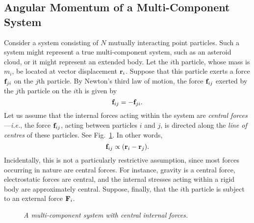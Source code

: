 \subsection{Angular Momentum of a Multi-Component System}\label{sam}
Consider a system consisting of $N$ mutually interacting point particles.
Such a system might represent a true multi-component system, such as an asteroid cloud,
or it might represent an extended body.
Let the $i$th particle, whose mass is $m_i$, be located at vector displacement ${\bf r}_i$.
Suppose that this particle exerts a force ${\bf f}_{ji}$ on the $j$th particle. By Newton's third
law of motion, the force ${\bf f}_{ij}$ exerted  by the $j$th particle on the $i$th  is
given by
\begin{equation}\label{e966}
{\bf f}_{ij} = - {\bf f}_{ji}.
\end{equation}
Let us assume that the internal forces acting within the system are {\em central forces}---{\em i.e.},
the force ${\bf f}_{ij}$, acting between particles $i$ and $j$, is directed along the
{\em line of centres} of these particles. See Fig.~\ref{f88}.
In other words,
\begin{equation}
{\bf f}_{ij} \propto ({\bf r}_i - {\bf r}_j).
\end{equation}
Incidentally, this is not a particularly restrictive assumption, since most forces occurring in nature are
central forces. For instance, gravity is a central force, electrostatic forces are central,
 and the internal stresses acting within a rigid body are approximately central.
Suppose, finally, that the $i$th particle is subject to an external force ${\bf F}_i$. 

\begin{figure}
\epsfysize=3in
\centerline{}
\caption{\em A multi-component system with central internal forces.}\label{f88}  
\end{figure}

